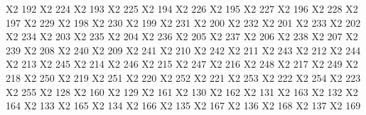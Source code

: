 \else {} 
\fi


\exchardef \CYRA     X2  192
\exchardef \cyra     X2  224
\exchardef \CYRB     X2  193
\exchardef \cyrb     X2  225
\exchardef \CYRV     X2  194
\exchardef \cyrv     X2  226
\exchardef \CYRG     X2  195
\exchardef \cyrg     X2  227
\exchardef \CYRD     X2  196
\exchardef \cyrd     X2  228
\exchardef \CYRE     X2  197
\exchardef \cyre     X2  229
\exchardef \CYRZH    X2  198
\exchardef \cyrzh    X2  230
\exchardef \CYRZ     X2  199
\exchardef \cyrz     X2  231
\exchardef \CYRI     X2  200
\exchardef \cyri     X2  232
\exchardef \CYRISHRT X2  201
\exchardef \cyrishrt X2  233
\exchardef \CYRK     X2  202
\exchardef \cyrk     X2  234
\exchardef \CYRL     X2  203
\exchardef \cyrl     X2  235
\exchardef \CYRM     X2  204
\exchardef \cyrm     X2  236
\exchardef \CYRN     X2  205
\exchardef \cyrn     X2  237
\exchardef \CYRO     X2  206
\exchardef \cyro     X2  238
\exchardef \CYRP     X2  207
\exchardef \cyrp     X2  239
\exchardef \CYRR     X2  208
\exchardef \cyrr     X2  240
\exchardef \CYRS     X2  209
\exchardef \cyrs     X2  241
\exchardef \CYRT     X2  210
\exchardef \cyrt     X2  242
\exchardef \CYRU     X2  211
\exchardef \cyru     X2  243
\exchardef \CYRF     X2  212
\exchardef \cyrf     X2  244
\exchardef \CYRH     X2  213
\exchardef \cyrh     X2  245
\exchardef \CYRC     X2  214
\exchardef \cyrc     X2  246
\exchardef \CYRCH    X2  215
\exchardef \cyrch    X2  247
\exchardef \CYRSH    X2  216
\exchardef \cyrsh    X2  248
\exchardef \CYRSHCH  X2  217
\exchardef \cyrshch  X2  249
\exchardef \CYRHRDSN X2  218
\exchardef \cyrhrdsn X2  250
\exchardef \CYRERY   X2  219
\exchardef \cyrery   X2  251
\exchardef \CYRSFTSN X2  220
\exchardef \cyrsftsn X2  252
\exchardef \CYREREV  X2  221
\exchardef \cyrerev  X2  253
\exchardef \CYRYU    X2  222
\exchardef \cyryu    X2  254
\exchardef \CYRYA    X2  223
\exchardef \cyrya    X2  255
\exchardef \CYRGUP   X2  128
\exchardef \cyrgup   X2  160
\exchardef \CYRGHCRS X2  129
\exchardef \cyrghcrs X2  161
\exchardef \CYRGDSC  X2  130
\exchardef \cyrgdsc  X2  162
\exchardef \CYRGHK   X2  131
\exchardef \cyrghk   X2  163
\exchardef \CYRSHHA  X2  132
\exchardef \cyrshha  X2  164
\exchardef \CYRZHDSC X2  133
\exchardef \cyrzhdsc X2  165
\exchardef \CYRZDSC  X2  134
\exchardef \cyrzdsc  X2  166
\exchardef \CYRABHDZE X2 135
\exchardef \cyrabhdze X2 167
\exchardef \CYRYI    X2  136
\exchardef \cyryi    X2  168
\exchardef \CYRKDSC  X2  137
\exchardef \cyrkdsc  X2  169
